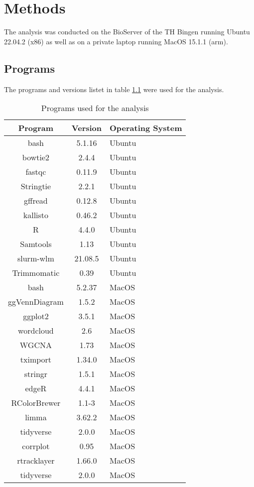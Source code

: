 \chapter{Methods}
The analysis was conducted on the BioServer of the TH Bingen running 
Ubuntu 22.04.2 (x86) as well as on a private laptop running MacOS 15.1.1 (arm). 
\section{Programs}
The programs and versions listet in table \ref{tab:programs} were used for the analysis.

\begin{table}[H]
	\center
	\caption{Programs used for the analysis}\label{tab:programs}
	\begin{tabular}{ccl}
		\toprule

    Program       & Version & Operating System        \\
		\midrule
    bash          & 5.1.16 & Ubuntu       \\
		bowtie2       & 2.4.4   & Ubuntu      \\
		fastqc        & 0.11.9    & Ubuntu    \\
		Stringtie & 2.2.1      & Ubuntu   \\
		gffread       & 0.12.8      & Ubuntu  \\
		kallisto      & 0.46.2       & Ubuntu \\
		R             & 4.4.0        & Ubuntu \\
		Samtools      & 1.13         & Ubuntu \\
		slurm-wlm          & 21.08.5 & Ubuntu \\
		Trimmomatic   & 0.39         & Ubuntu \\
    bash          & 5.2.37    & MacOS    \\
    ggVennDiagram             & 1.5.2  & MacOS       \\
    ggplot2           &   3.5.1   & MacOS   \\
    wordcloud            &   2.6  & MacOS    \\
    WGCNA           &   1.73   & MacOS   \\
    tximport          &     1.34.0 & MacOS   \\
    stringr        &     1.5.1  & MacOS  \\
    edgeR           &   4.4.1    & MacOS  \\
    RColorBrewer         &  1.1-3   & MacOS    \\
    limma         &  3.62.2    & MacOS   \\
    tidyverse         &  2.0.0    & MacOS   \\
    corrplot         &  0.95    & MacOS   \\
    rtracklayer         &  1.66.0 & MacOS \\
    tidyverse         &  2.0.0   & MacOS    \\
		\bottomrule
	\end{tabular}
\end{table}

